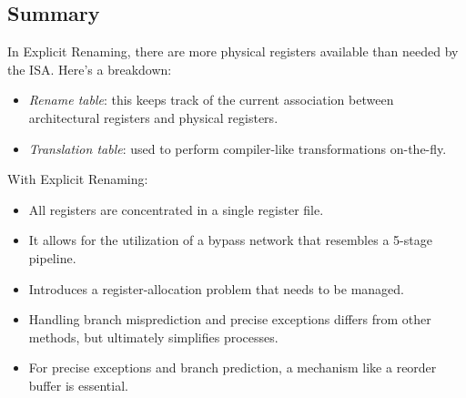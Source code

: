 \subsection{Summary}
In Explicit Renaming, there are more physical registers available than needed by the ISA.
Here's a breakdown:
\begin{itemize}
    \item \textit{Rename table}: this keeps track of the current association between architectural registers and physical registers.
    \item \textit{Translation table}: used to perform compiler-like transformations on-the-fly.
\end{itemize}
With Explicit Renaming:
\begin{itemize}
    \item All registers are concentrated in a single register file.
    \item It allows for the utilization of a bypass network that resembles a 5-stage pipeline.
    \item Introduces a register-allocation problem that needs to be managed.
    \item Handling branch misprediction and precise exceptions differs from other methods, but ultimately simplifies processes.
    \item For precise exceptions and branch prediction, a mechanism like a reorder buffer is essential.
\end{itemize}


